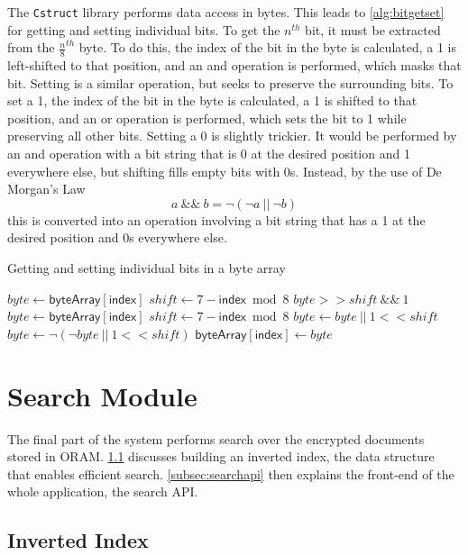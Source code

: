 \documentclass[12pt,a4paper,twoside,openright]{report}
\begin{document}
The \texttt{Cstruct} library performs data access in bytes. This leads to \cref{alg:bitgetset} for getting and setting individual bits. To get the $n^{th}$ bit, it must be extracted from the $\frac{n}{8}^{th}$ byte. To do this, the index of the bit in the byte is calculated, a 1 is left-shifted to that position, and an and operation is performed, which masks that bit. Setting is a similar operation, but seeks to preserve the surrounding bits. To set a 1, the index of the bit in the byte is calculated, a 1 is shifted to that position, and an or operation is performed, which sets the bit to 1 while preserving all other bits. Setting a 0 is slightly trickier. It would be performed by an and operation with a bit string that is 0 at the desired position and 1 everywhere else, but shifting fills empty bits with 0s. Instead, by the use of De Morgan's Law $$ a~\&\&~b = \neg (\neg a~||~\neg b) $$ this is converted into an operation involving a bit string that has a 1 at the desired position and 0s everywhere else.

\begin{algorithm}[t]
\caption{Getting and setting individual bits in a byte array}
\label{alg:bitgetset}
\begin{algorithmic}
\vskip 10pt
  \State $byte \gets \mathsf{byteArray[index]}$
  \State $shift \gets 7 - \mathsf{index} \bmod 8$
  \State \Return $byte >> shift~\&\&~1$
\EndFunction
\vskip 10pt
  \State $byte \gets \mathsf{byteArray[index]}$
  \State $shift \gets 7 - \mathsf{index} \bmod 8$
    \State $byte \gets byte~||~1 << shift$
  \Else
    \State $byte \gets \neg (\neg byte~||~1 << shift)$
  \EndIf
  \State $\mathsf{byteArray[index]} \gets byte$
\EndFunction
\vskip 10pt
\end{algorithmic}
\end{algorithm}

\section{Search Module}
\label{sec:searchmodule}

The final part of the system performs search over the encrypted documents stored in ORAM. \cref{subsec:invertedindex} discusses building an inverted index, the data structure that enables efficient search. \cref{subsec:searchapi} then explains the front-end of the whole application, the search API.

\subsection{Inverted Index}
\label{subsec:invertedindex}
\end{document}
